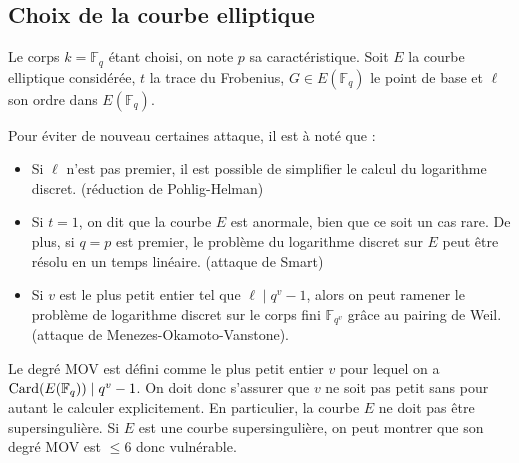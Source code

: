 \subsection{Choix de la courbe elliptique}
Le corps $k = \mathbb{F}_{q}$ étant choisi, on note $p$ sa caractéristique. Soit $E$ la courbe
elliptique considérée, $t$ la trace du Frobenius, $G \in E(\mathbb{F}_{q})$ le point de base et
$\ell$ son ordre dans $E(\mathbb{F}_{q})$.

Pour éviter de nouveau certaines attaque, il est à noté que :
\begin{itemize}
    \item Si $\ell$ n'est pas premier, il est possible de simplifier le calcul du logarithme
        discret. (réduction de Pohlig-Helman)
    \item Si $t=1$, on dit que la courbe $E$ est anormale, bien que ce soit un cas rare. De
        plus, si $q = p$ est premier, le problème du logarithme discret sur $E$ peut être
        résolu en un temps linéaire. (attaque de Smart)
    \item Si $v$ est le plus petit entier tel que $\ell \mid q^{v}-1$, alors on peut ramener le
        problème de logarithme discret sur le corps fini $\mathbb{F}_{q^{v}}$ grâce au pairing
        de Weil. (attaque de Menezes-Okamoto-Vanstone).
\end{itemize}

Le degré MOV est défini comme le plus petit entier $v$ pour lequel on a
$\operatorname{Card}(E(\mathbb{F}_{q})) \mid q^{v} - 1$. On doit donc s'assurer que $v$ ne soit pas petit
sans pour autant le calculer explicitement. En particulier, la courbe $E$ ne doit pas être
supersingulière. Si $E$ est une courbe supersingulière, on peut montrer que son degré MOV est
$\le 6$ donc vulnérable.




